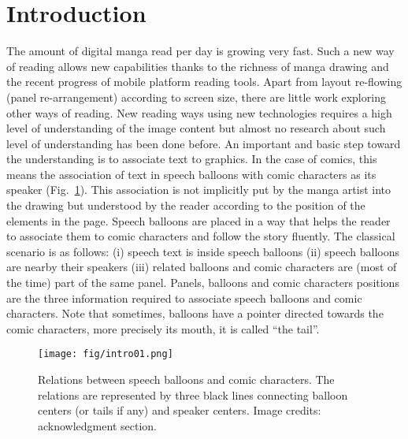 \documentclass[conference]{IEEEtran}
\begin{document}
\section{Introduction}
The amount of digital manga read per day is growing very fast.
Such a new way of reading allows new capabilities thanks to the richness of manga drawing and the recent progress of mobile platform reading tools.
Apart from layout re-flowing (panel re-arrangement) according to screen size, there are little work exploring other ways of reading.
New reading ways using new technologies requires a high level of understanding of the image content but almost no research about such level of understanding has been done before. 
An important and basic step toward the understanding is to associate text to graphics.
In the case of comics, this means the association of text in speech balloons with comic characters as its speaker (Fig.~\ref{fig:intro}).
This association is not implicitly put by the manga artist into the drawing but understood by the reader according to the position of the elements in the page.
Speech balloons are placed in a way that helps the reader to associate them to comic characters and follow the story fluently.
The classical scenario is as follows: (i) speech text is inside speech balloons (ii) speech balloons are nearby their speakers (iii) related balloons and comic characters are (most of the time) part of the same panel.
Panels, balloons and comic characters positions are the three information required to associate speech balloons and comic characters.
Note that sometimes, balloons have a pointer directed towards the comic characters, more precisely its mouth, it is called ``the tail''.


 \begin{figure}[!t]  %
   \centering
  \texttt{[image: fig/intro01.png]}
  \caption{Relations between speech balloons and comic characters. The relations are represented by three black lines connecting balloon centers (or tails if any) and speaker centers. Image credits: acknowledgment section.}
  \label{fig:intro}
 \end{figure}
\end{document}
